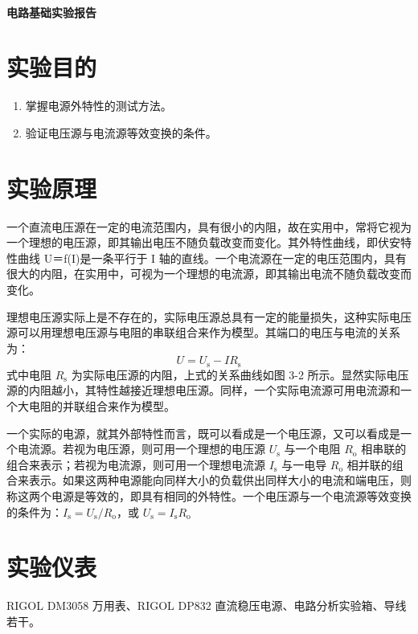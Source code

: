 \documentclass[a4paper,utf8]{article}
\begin{document}
\begin{center}
    {\mbox{}\\[7em]\bfseries\songti%
    电路基础实验报告}\\[34mm]
\end{center}
\newpage
\section{实验目的}
\begin{enumerate}
    \item 掌握电源外特性的测试方法。
    \item 验证电压源与电流源等效变换的条件。
\end{enumerate}

\section{实验原理}%
一个直流电压源在一定的电流范围内，具有很小的内阻，故在实用中，常将它视为一个理想的电压源，即其输出电压不随负载改变而变化。其外特性曲线，即伏安特性曲线 U＝f(I)是一条平行于 I 轴的直线。一个电流源在一定的电压范围内，具有很大的内阻，在实用中，可视为一个理想的电流源，即其输出电流不随负载改变而变化。\par
理想电压源实际上是不存在的，实际电压源总具有一定的能量损失，这种实际电压源可以用理想电压源与电阻的串联组合来作为模型。其端口的电压与电流的关系为：
\begin{equation}
    U = U_\text{s} - I R_\text{s}
\end{equation}
式中电阻 $R_\text{s}$ 为实际电压源的内阻，上式的关系曲线如图 3-2 所示。显然实际电压源的内阻越小，其特性越接近理想电压源。同样，一个实际电流源可用电流源和一个大电阻的并联组合来作为模型。\par
一个实际的电源，就其外部特性而言，既可以看成是一个电压源，又可以看成是一个电流源。若视为电压源，则可用一个理想的电压源 $U_\text{s}$ 与一个电阻 $R_\text{o}$ 相串联的组合来表示；若视为电流源，则可用一个理想电流源 $I_\text{s}$ 与一电导 $R_\text{o}$ 相并联的组合来表示。如果这两种电源能向同样大小的负载供出同样大小的电流和端电压，则称这两个电源是等效的，即具有相同的外特性。一个电压源与一个电流源等效变换的条件为：$I_\text{s}=U_\text{s}/R_\text{o}$，或 $U_\text{s}=I_\text{s} R_\text{o}$
\section{实验仪表}
    RIGOL DM3058 万用表、RIGOL DP832 直流稳压电源、电路分析实验箱、导线若干。
\end{document}
